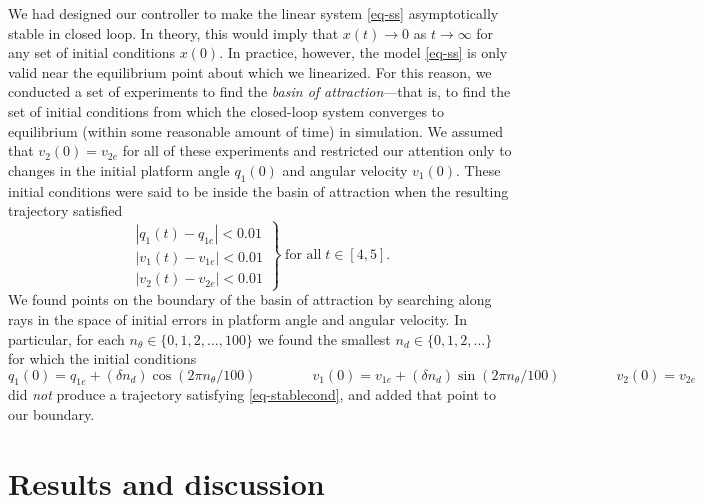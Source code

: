 \documentclass[conf]{new-aiaa}
\begin{document}
We had designed our controller to make the linear system \eqref{eq-ss} asymptotically stable in closed loop. In theory, this would imply that $x(t) \rightarrow 0$ as $t \rightarrow \infty$ for any set of initial conditions $x(0)$. In practice, however, the model \eqref{eq-ss} is only valid near the equilibrium point about which we linearized. For this reason, we conducted a set of experiments to find the {\em basin of attraction}---that is, to find the set of initial conditions from which the closed-loop system converges to equilibrium (within some reasonable amount of time) in simulation.
We assumed that $v_{2}(0) = v_{2e}$ for all of these experiments and restricted our attention only to changes in the initial platform angle $q_{1}(0)$ and angular velocity $v_{1}(0)$.
These initial conditions were said to be inside the basin of attraction when the resulting trajectory satisfied
\begin{equation}
\left.\begin{matrix}
|q_{1}(t) - q_{1e}| < 0.01 \\
|v_{1}(t) - v_{1e}| < 0.01 \\
|v_{2}(t) - v_{2e}| < 0.01
\end{matrix}
\right\}
\;\text{for all}\; t \in [4, 5].
\label{eq-stablecond}
\end{equation}
We found points on the boundary of the basin of attraction by searching along rays in the space of initial errors in platform angle and angular velocity.
In particular, for each $n_{\theta} \in \{0, 1, 2, \ldots, 100 \}$
we found the smallest $n_{d} \in \{0, 1, 2, \ldots\}$
for which the initial conditions
\begin{equation}
q_{1}(0) = q_{1e} + (\delta n_{d})\cos\left(2\pi n_{\theta} / 100\right)
\qquad\qquad
v_{1}(0) = v_{1e} + (\delta n_{d})\sin\left(2\pi n_{\theta} / 100\right)
\qquad\qquad
v_{2}(0) = v_{2e}
\end{equation}
did {\em not} produce a trajectory satisfying \eqref{eq-stablecond}, and added that point to our boundary.


\section{Results and discussion}
\label{sec-results}
\end{document}

